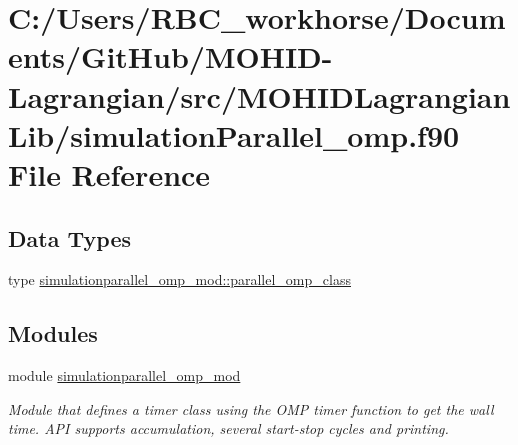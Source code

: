 \hypertarget{simulation_parallel__omp_8f90}{}\section{C\+:/\+Users/\+R\+B\+C\+\_\+workhorse/\+Documents/\+Git\+Hub/\+M\+O\+H\+I\+D-\/\+Lagrangian/src/\+M\+O\+H\+I\+D\+Lagrangian\+Lib/simulation\+Parallel\+\_\+omp.f90 File Reference}
\label{simulation_parallel__omp_8f90}
\subsection*{Data Types}
\begin{DoxyCompactItemize}
\item 
type \mbox{\hyperlink{structsimulationparallel__omp__mod_1_1parallel__omp__class}{simulationparallel\+\_\+omp\+\_\+mod\+::parallel\+\_\+omp\+\_\+class}}
\end{DoxyCompactItemize}
\subsection*{Modules}
\begin{DoxyCompactItemize}
\item 
module \mbox{\hyperlink{namespacesimulationparallel__omp__mod}{simulationparallel\+\_\+omp\+\_\+mod}}
\begin{DoxyCompactList}\small\item\em Module that defines a timer class using the O\+MP timer function to get the wall time. A\+PI supports accumulation, several start-\/stop cycles and printing. \end{DoxyCompactList}\end{DoxyCompactItemize}

